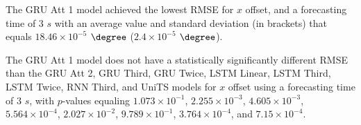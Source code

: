 \begin{table}[!ht]
	\centering
	\caption{The average RMSE ($\times 10^{-4}$), with standard deviation in brackets, across $k$-fold validation datasets for the $x$ offset estimated on the $k$-fold testing datasets by different RNN models, and forecasting times.}
	\label{tab:best_longitude_no_abs_RMSE}
\end{table}

The GRU Att 1 model achieved the lowest RMSE for $x$ offset, and a forecasting time of $3$ $s$ with an average value and standard deviation (in brackets) that equals $18.46 \times 10^{-5}$ $\degree$ ($2.4 \times 10^{-5}$ $\degree$).

The GRU Att 1 model does not have a statistically significantly different RMSE than the GRU Att 2, GRU Third, GRU Twice, LSTM Linear, LSTM Third, LSTM Twice, RNN Third, and UniTS models for $x$ offset using a forecasting time of $3$ $s$, with $p$-values equaling $1.073 \times 10^{-1}$, $2.255 \times 10^{-3}$, $4.605 \times 10^{-3}$, $5.564 \times 10^{-4}$, $2.027 \times 10^{-2}$, $9.789 \times 10^{-1}$, $3.764 \times 10^{-4}$, and $7.15 \times 10^{-4}$.


